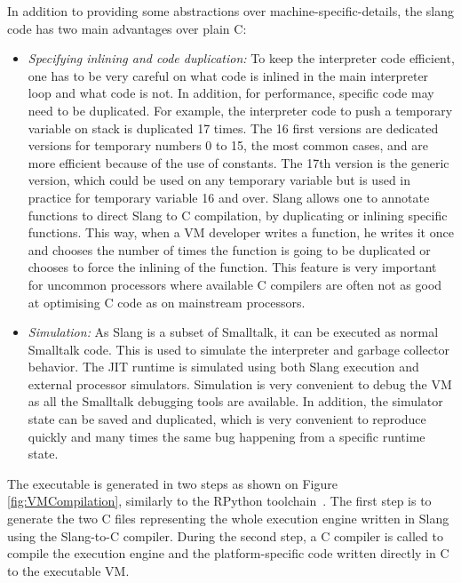 \documentclass[a4paper,12pt,twoside]{../includes/ThesisStyle}
\begin{document}
In addition to providing some abstractions over machine-specific-details, the slang code has two main advantages over plain C:
\begin{itemize}
	\item \emph{Specifying inlining and code duplication:} To keep the interpreter code efficient, one has to be very careful on what code is inlined in the main interpreter loop and what code is not. In addition, for performance, specific code may need to be duplicated. For example, the interpreter code to push a temporary variable on stack is duplicated 17 times. The 16 first versions are dedicated versions for temporary numbers 0 to 15, the most common cases, and are more efficient because of the use of constants. The 17th version is the generic version, which could be used on any temporary variable but is used in practice for temporary variable 16 and over. Slang allows one to annotate functions to direct Slang to C compilation, by duplicating or inlining specific functions. This way, when a VM developer writes a function, he writes it once and chooses the number of times the function is going to be duplicated or chooses to force the inlining of the function. This feature is very important for uncommon processors where available C compilers are often not as good at optimising C code as on mainstream processors.
	\item \emph{Simulation:} As Slang is a subset of Smalltalk, it can be executed as normal Smalltalk code. This is used to simulate the interpreter and garbage collector behavior. The JIT runtime is simulated using both Slang execution and external processor simulators. Simulation is very convenient to debug the VM as all the Smalltalk debugging tools are available. In addition, the simulator state can be saved and duplicated, which is very convenient to reproduce quickly and many times the same bug happening from a specific runtime state.
\end{itemize}

The executable is generated in two steps as shown on Figure \ref{fig:VMCompilation}, similarly to the RPython toolchain~\cite{Rigo06a}. The first step is to generate the two C files representing the whole execution engine written in Slang using the Slang-to-C compiler. During the second step, a C compiler is called to compile the execution engine and the platform-specific code written directly in C to the executable VM.
\end{document}
